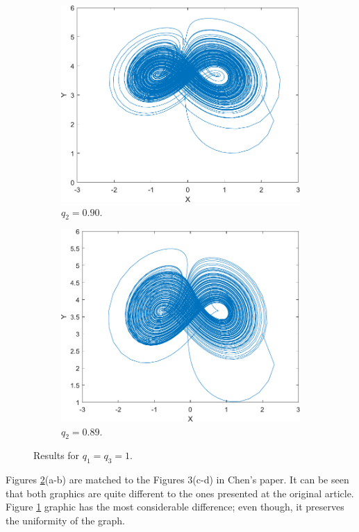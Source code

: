 \begin{figure}[H]
  \centering
  \begin{subfigure}[H]{0.4\textwidth}
    \includegraphics[scale = 0.5]{files/c_1_090_1.pdf}
    \centering
    \caption{$q_2=0.90$.}
  \end{subfigure}
  \hspace{1cm}
  \begin{subfigure}[H]{0.4\textwidth}
    \includegraphics[scale = 0.5]{files/d_1_089_1.pdf}
    \centering
    \caption{$q_2=0.89$.}
    \label{img:messed}
  \end{subfigure}
  \caption{Results for $q_1=q_3=1$.}
  \label{img:q1eqq3}
\end{figure}
Figures \ref{img:q1eqq3}(a-b) are matched to the Figures 3(c-d) in Chen's paper. It can be seen that both graphics are quite different to the ones presented at the original article. Figure \ref{img:messed} graphic has the most considerable difference; even though, it preserves the uniformity of the graph.

